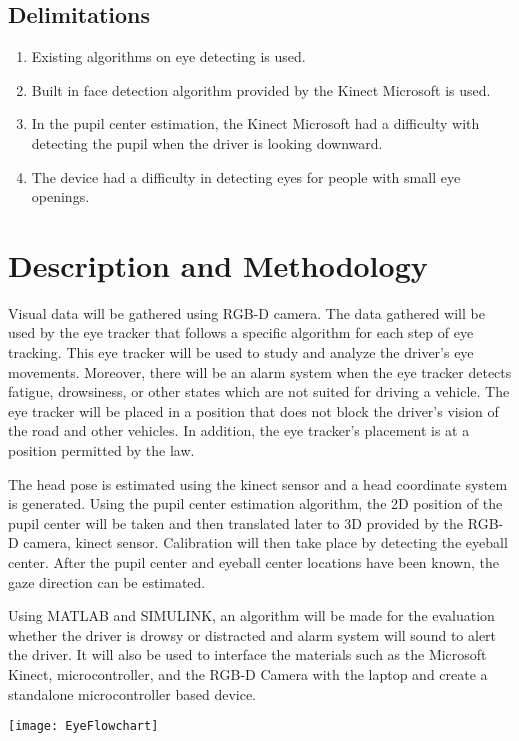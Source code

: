 \subsection{Delimitations}
\begin{enumerate}
	
	\item Existing algorithms on eye detecting is used.
	
	\item Built in face detection algorithm provided by the Kinect Microsoft is used.
	
	\item In the pupil center estimation, the Kinect Microsoft had a difficulty with detecting the pupil when the driver is looking downward.
	
	\item The device had a difficulty in detecting eyes for people with small eye openings.
		
\end{enumerate}

\section{Description and Methodology}

Visual data will be gathered using RGB-D camera. The data gathered will be used by the eye tracker that follows a specific algorithm for each step of eye tracking. This eye tracker will be used to study and analyze the driver’s eye movements. Moreover, there will be an alarm system when the eye tracker detects fatigue, drowsiness, or other states which are not suited for driving a vehicle. The eye tracker will be placed in a position that does not block the driver’s vision of the road and other vehicles. In addition, the eye tracker’s placement is at a position permitted by the law.

The head pose is estimated using the kinect sensor and a head coordinate system is generated. Using the pupil center estimation algorithm, the 2D position of the pupil center will be taken and then translated later to 3D provided by the RGB-D camera, kinect sensor. Calibration will then take place by detecting the eyeball center. After the pupil center and eyeball center locations have been known, the gaze direction can be estimated.

Using MATLAB and SIMULINK, an algorithm will be made for the evaluation whether the driver is drowsy or distracted and alarm system will sound to alert the driver. It will also be used to interface the materials such as the Microsoft Kinect, microcontroller, and the RGB-D Camera with the laptop and create a standalone microcontroller based device. 
\begin{center}
\texttt{[image: EyeFlowchart]}
\end{center}

